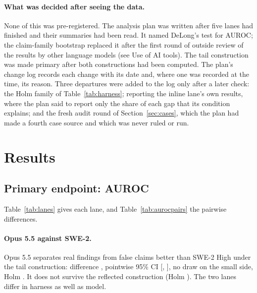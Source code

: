\documentclass[11pt]{article}
\begin{document}
\paragraph{What was decided after seeing the data.} None of this was pre-registered. The analysis plan was written after five lanes had finished and their summaries had been read. It named DeLong's test \citep{delong1988} for AUROC; the claim-family bootstrap replaced it after the first round of outside review of the results by other language models (see Use of AI tools). The tail construction was made primary after both constructions had been computed. The plan's change log records each change with its date and, where one was recorded at the time, its reason. Three departures were added to the log only after a later check: the Holm family of Table~\ref{tab:harness}; reporting the inline lane's own results, where the plan said to report only the share of each gap that its condition explains; and the fresh audit round of Section~\ref{sec:cases}, which the plan had made a fourth case source and which was never ruled or run.

\section{Results}
\label{sec:results}

\begin{table}[t]
\centering\small
\resizebox{\textwidth}{!}{}
\caption{Per lane, frozen labels, 144 cases (52 real, 92 false). Fable ran once per case, the others three times. Intervals: claim-family percentile bootstrap; Fable's recall interval is Clopper-Pearson.}
\label{tab:lanes}
\end{table}

\subsection{Primary endpoint: AUROC}

Table~\ref{tab:lanes} gives each lane, and Table~\ref{tab:aurocpairs} the pairwise differences.

\paragraph{Opus 5.5 against SWE-2.} Opus 5.5 separates real findings from false claims better than SWE-2 High under the tail construction: difference , pointwise 95\% CI [, ], no draw on the small side, Holm . It does not survive the reflected construction (Holm ). The two lanes differ in harness as well as model.
\end{document}
